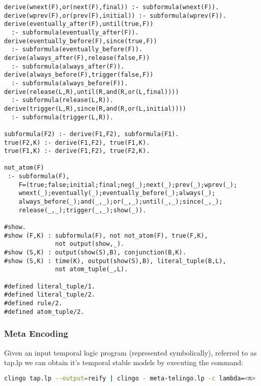 \begin{center}
\begin{minipage}{\linewidth}
  \begin{lstlisting}[language=clingo, label={lst:meta-telingo2}]
derive(wnext(F),or(next(F),final)) :- subformula(wnext(F)).
derive(wprev(F),or(prev(F),initial)) :- subformula(wprev(F)).
derive(eventually_after(F),until(true,F)) 
  :- subformula(eventually_after(F)).
derive(eventually_before(F),since(true,F)) 
  :- subformula(eventually_before(F)).
derive(always_after(F),release(false,F)) 
  :- subformula(always_after(F)).
derive(always_before(F),trigger(false,F)) 
  :- subformula(always_before(F)).
derive(release(L,R),until(R,and(R,or(L,final)))) 
  :- subformula(release(L,R)).
derive(trigger(L,R),since(R,and(R,or(L,initial)))) 
  :- subformula(trigger(L,R)).

subformula(F2) :- derive(F1,F2), subformula(F1).
true(F2,K) :- derive(F1,F2), true(F1,K).
true(F1,K) :- derive(F1,F2), true(F2,K).

not_atom(F) 
 :- subformula(F), 
    F=(true;false;initial;final;neg(_);next(_);prev(_);wprev(_);
    wnext(_);eventually(_);eventually_before(_);always(_);
    always_before(_);and(_,_);or(_,_);until(_,_);since(_,_);
    release(_,_);trigger(_,_);show(_)).

#show.
#show (F,K) : subformula(F), not not_atom(F), true(F,K), 
              not output(show,_).
#show (S,K) : output(show(S),B), conjunction(B,K).
#show (S,K) : time(K), output(show(S),B), literal_tuple(B,L), 
              not atom_tuple(_,L).

#defined literal_tuple/1.
#defined literal_tuple/2.
#defined rule/2.
#defined atom_tuple/2.
\end{lstlisting}
\end{minipage}
\end{center}

\subsubsection{Meta Encoding}

Given an input temporal logic program (represented symbolically),
referred to as tap.lp we can obtain it's temporal stable models by
executing the command:

\begin{lstlisting}[language=bash,numbers=none]
clingo tap.lp --output=reify | clingo - meta-telingo.lp -c lambda=<n>
\end{lstlisting}

